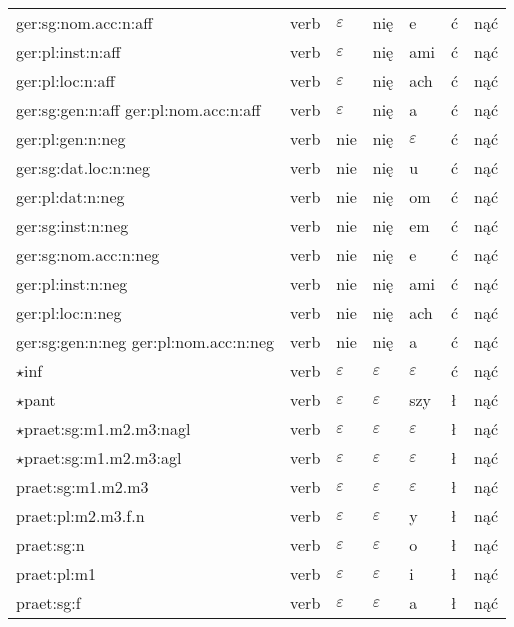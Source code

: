 \documentclass{article}
\begin{document}
\begin{longtable}{p{7cm}|l|l|l|l|l|l}
ger:sg:nom.acc:n:aff & verb & $\varepsilon$ & nię & e & ć & nąć\\
ger:pl:inst:n:aff & verb & $\varepsilon$ & nię & ami & ć & nąć\\
ger:pl:loc:n:aff & verb & $\varepsilon$ & nię & ach & ć & nąć\\
ger:sg:gen:n:aff ger:pl:nom.acc:n:aff & verb & $\varepsilon$ & nię & a & ć & nąć\\
ger:pl:gen:n:neg & verb & nie & nię & $\varepsilon$ & ć & nąć\\
ger:sg:dat.loc:n:neg & verb & nie & nię & u & ć & nąć\\
ger:pl:dat:n:neg & verb & nie & nię & om & ć & nąć\\
ger:sg:inst:n:neg & verb & nie & nię & em & ć & nąć\\
ger:sg:nom.acc:n:neg & verb & nie & nię & e & ć & nąć\\
ger:pl:inst:n:neg & verb & nie & nię & ami & ć & nąć\\
ger:pl:loc:n:neg & verb & nie & nię & ach & ć & nąć\\
ger:sg:gen:n:neg ger:pl:nom.acc:n:neg & verb & nie & nię & a & ć & nąć\\
$\star$inf & verb & $\varepsilon$ & $\varepsilon$ & $\varepsilon$ & ć & nąć\\
$\star$pant & verb & $\varepsilon$ & $\varepsilon$ & szy & ł & nąć\\
$\star$praet:sg:m1.m2.m3:nagl & verb & $\varepsilon$ & $\varepsilon$ & $\varepsilon$ & ł & nąć\\
$\star$praet:sg:m1.m2.m3:agl & verb & $\varepsilon$ & $\varepsilon$ & $\varepsilon$ & ł & nąć\\
praet:sg:m1.m2.m3 & verb & $\varepsilon$ & $\varepsilon$ & $\varepsilon$ & ł & nąć\\
praet:pl:m2.m3.f.n & verb & $\varepsilon$ & $\varepsilon$ & y & ł & nąć\\
praet:sg:n & verb & $\varepsilon$ & $\varepsilon$ & o & ł & nąć\\
praet:pl:m1 & verb & $\varepsilon$ & $\varepsilon$ & i & ł & nąć\\
praet:sg:f & verb & $\varepsilon$ & $\varepsilon$ & a & ł & nąć\\
\end{longtable}
\end{document}
